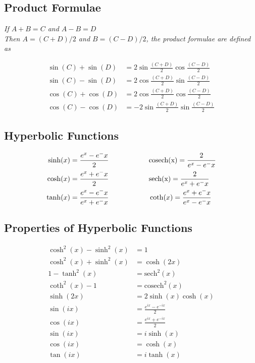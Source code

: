 \subsection{Product Formulae}
\textit{If $A+B = C$ and $A-B = D$}\\
\textit{Then $A = (C+D)/2$ and $B = (C-D)/2$, the product formulae are defined as}

\begin{align*}
\sin(C) + \sin(D) &= 2\sin\frac{(C+D)}{2}\cos\frac{(C-D)}{2}\\
\sin(C) - \sin(D) &= 2\cos\frac{(C+D)}{2}\sin\frac{(C-D)}{2}\\
\cos(C) + \cos(D) &= 2\cos\frac{(C+D)}{2}\cos\frac{(C-D)}{2}\\
\cos(C) - \cos(D) &= -2\sin\frac{(C+D)}{2}\sin\frac{(C-D)}{2}
\end{align*}

\subsection{Hyperbolic Functions}
\begin{align*}
\sinh(x) &= \frac{e^x - e^-x}{2} \hspace{20mm} \mathrm{cosech(x)} = \frac{2}{e^x - e^-x}\\
\cosh(x) &= \frac{e^x + e^-x}{2} \hspace{20mm} \mathrm{sech(x)} = \frac{2}{e^x + e^-x}\\
\tanh(x) &= \frac{e^x - e^-x}{e^x + e^-x} \hspace{20mm} \coth(x) = \frac{e^x + e^-x}{e^x - e^-x}
\end{align*}

\subsection{Properties of Hyperbolic Functions}
\begin{align*}
\cosh^2(x) - \sinh^2(x) &= 1\\
\cosh^2(x) + \sinh^2(x) &= \cosh(2x)\\
1 - \tanh^2(x) &= \mathrm{sech}^2(x)\\
\coth^2(x) - 1 &= \mathrm{cosech}^2(x)\\
\sinh(2x) &= 2\sinh(x)\cosh(x)\\
\sin(ix) &= \frac{e^{ix} - e^{-ix}}{2}\\
\cos(ix) &= \frac{e^{ix} + e^{-ix}}{2}\\
\sin(ix) &= i\sinh(x)\\
\cos(ix) &= \cosh(x)\\
\tan(ix) &= i\tanh(x)
\end{align*}

